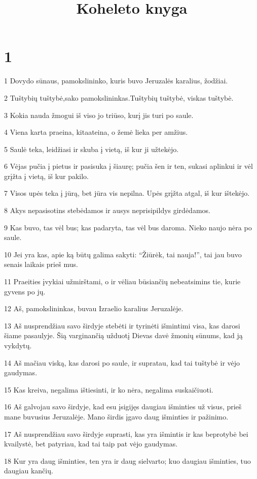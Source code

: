 

\title{Koheleto knyga}

\chapter{1}


\par 1 Dovydo sūnaus, pamokslininko, kuris buvo Jeruzalės karalius, žodžiai. 
\par 2 Tuštybių tuštybė,­sako pamokslininkas.­Tuštybių tuštybė, viskas tuštybė. 
\par 3 Kokia nauda žmogui iš viso jo triūso, kurį jis turi po saule. 
\par 4 Viena karta praeina, kita­ateina, o žemė lieka per amžius. 
\par 5 Saulė teka, leidžiasi ir skuba į vietą, iš kur ji užtekėjo. 
\par 6 Vėjas pučia į pietus ir pasisuka į šiaurę; pučia šen ir ten, sukasi aplinkui ir vėl grįžta į vietą, iš kur pakilo. 
\par 7 Visos upės teka į jūrą, bet jūra vis nepilna. Upės grįžta atgal, iš kur ištekėjo. 
\par 8 Akys nepasisotins stebėdamos ir ausys neprisipildys girdėdamos. 
\par 9 Kas buvo, tas vėl bus; kas padaryta, tas vėl bus daroma. Nieko naujo nėra po saule. 
\par 10 Jei yra kas, apie ką būtų galima sakyti: “Žiūrėk, tai nauja!”, tai jau buvo senais laikais prieš mus. 
\par 11 Praeities įvykiai užmirštami, o ir vėliau būsiančių nebeatsimins tie, kurie gyvens po jų. 
\par 12 Aš, pamokslininkas, buvau Izraelio karalius Jeruzalėje. 
\par 13 Aš nusprendžiau savo širdyje stebėti ir tyrinėti išmintimi visa, kas darosi šiame pasaulyje. Šią varginančią užduotį Dievas davė žmonių sūnums, kad ją vykdytų. 
\par 14 Aš mačiau viską, kas darosi po saule, ir supratau, kad tai tuštybė ir vėjo gaudymas. 
\par 15 Kas kreiva, negalima ištiesinti, ir ko nėra, negalima suskaičiuoti. 
\par 16 Aš galvojau savo širdyje, kad esu įsigijęs daugiau išminties už visus, prieš mane buvusius Jeruzalėje. Mano širdis įgavo daug išminties ir pažinimo. 
\par 17 Aš nusprendžiau savo širdyje suprasti, kas yra išmintis ir kas beprotybė bei kvailystė, bet patyriau, kad tai taip pat vėjo gaudymas. 
\par 18 Kur yra daug išminties, ten yra ir daug sielvarto; kuo daugiau išminties, tuo daugiau kančių.


